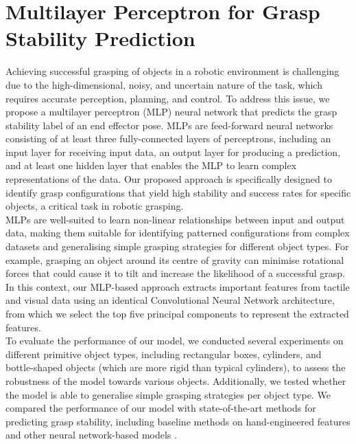 \documentclass[11pt, a4paper]{report}
\begin{document}
\chapter{Multilayer Perceptron for Grasp Stability Prediction}\label{chap:5}
Achieving successful grasping of objects in a robotic environment is challenging due to the high-dimensional, noisy, and uncertain nature of the task, which requires accurate perception, planning, and control. To address this issue, we propose a multilayer perceptron (MLP) neural network that predicts the grasp stability label of an end effector pose. MLPs are feed-forward neural networks consisting of at least three fully-connected layers of perceptrons, including an input layer for receiving input data, an output layer for producing a prediction, and at least one hidden layer that enables the MLP to learn complex representations of the data. Our proposed approach is specifically designed to identify grasp configurations that yield high stability and success rates for specific objects, a critical task in robotic grasping.\\

MLPs are well-suited to learn non-linear relationships between input and output data, making them suitable for identifying patterned configurations from complex datasets and generalising simple grasping strategies for different object types. For example, grasping an object around its centre of gravity can minimise rotational forces that could cause it to tilt and increase the likelihood of a successful grasp. In this context, our MLP-based approach extracts important features from tactile and visual data using an identical Convolutional Neural Network architecture, from which we select the top five principal components to represent the extracted features.\\

To evaluate the performance of our model, we conducted several experiments on different primitive object types, including rectangular boxes, cylinders, and bottle-shaped objects (which are more rigid than typical cylinders), to assess the robustness of the model towards various objects. Additionally, we tested whether the model is able to generalise simple grasping strategies per object type. We compared the performance of our model with state-of-the-art methods for predicting grasp stability, including baseline methods on hand-engineered features and other neural network-based models \cite{mahler2017dexnet, 7487517}.\\
\end{document}
